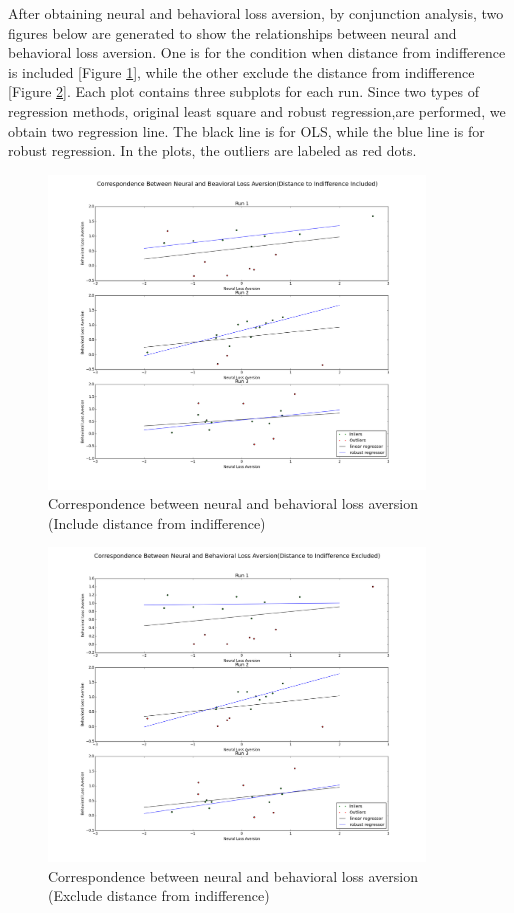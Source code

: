 \par \indent After obtaining neural and behavioral loss aversion, by
conjunction analysis, two figures below are generated to show the relationships
between neural and behavioral loss aversion. One is for the condition when
distance from indifference is included [Figure \ref{fig:cor1}], while the other exclude the distance from indifference [Figure \ref{fig:cor2}]. Each plot contains three subplots
for each run. Since two types of regression methods, original least square and
robust regression,are performed, we obtain two regression line. The black line is for OLS, while the blue line is for robust regression. In the plots, the outliers are labeled as red dots. 

\begin{figure}[h!]
\centering
\includegraphics[width=100mm]{images/correlation_dist2indiff.png}               
\caption{Correspondence between neural and behavioral loss aversion (Include
distance from indifference)}
\label{fig:cor1}
\end{figure}

\begin{figure}[h!]
\centering
\includegraphics[width=100mm]{images/correlation_no_dist2indiff.png}               
\caption{Correspondence between neural and behavioral loss aversion (Exclude
distance from indifference)}
\label{fig:cor2}
\end{figure}

